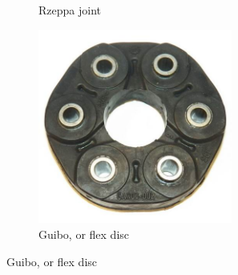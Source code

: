 \documentclass[10pt,letterpaper]{book}
\begin{document}
\begin{figure}[H]
\begin{subfigure}[b]{.24\linewidth}
			\caption{Rzeppa joint}
		\end{subfigure}
		\begin{subfigure}[b]{.24\linewidth}
			\includegraphics[width=0.7\textwidth]{imgs/coupling_guibo.jpeg}
			\caption{Guibo, or flex disc}
		\end{subfigure}
	\end{figure}
\end{document}
